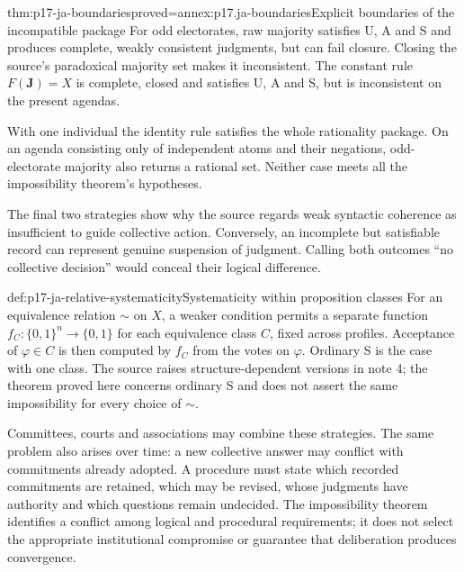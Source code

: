 \begin{hbtheorem}{thm:p17-ja-boundaries}{proved=annex:p17.ja-boundaries}{Explicit boundaries of the incompatible package}
For odd electorates, raw majority satisfies U, A and S and produces complete,
weakly consistent judgments, but can fail closure. Closing the source's
paradoxical majority set makes it inconsistent. The constant rule
\(F(\mathbf J)=X\) is complete, closed and satisfies U, A and S, but is
inconsistent on the present agendas.

With one individual the identity rule satisfies the whole rationality package.
On an agenda consisting only of independent atoms and their negations,
odd-electorate majority also returns a rational set. Neither case meets all
the impossibility theorem's hypotheses.
\end{hbtheorem}

The final two strategies show why the source regards weak syntactic coherence
as insufficient to guide collective action. Conversely, an incomplete but
satisfiable record can represent genuine suspension of judgment. Calling both
outcomes ``no collective decision'' would conceal their logical difference.

\begin{hbdefinition}{def:p17-ja-relative-systematicity}{Systematicity within proposition classes}
For an equivalence relation \(\sim\) on \(X\), a weaker condition permits a
separate function \(f_C:\{0,1\}^n\to\{0,1\}\) for each equivalence class
\(C\), fixed across profiles. Acceptance of \(\varphi\in C\) is then computed
by \(f_C\) from the votes on \(\varphi\). Ordinary S is the case with one
class. The source raises structure-dependent versions in note 4; the theorem
proved here concerns ordinary S and does not assert the same impossibility for
every choice of \(\sim\).
\end{hbdefinition}

Committees, courts and associations may combine these strategies. The same
problem also arises over time: a new collective answer may conflict with
commitments already adopted. A procedure must state which recorded commitments
are retained, which may be revised, whose judgments have authority and which
questions remain undecided. The impossibility theorem identifies a conflict
among logical and procedural requirements; it does not select the appropriate
institutional compromise or guarantee that deliberation produces convergence.
